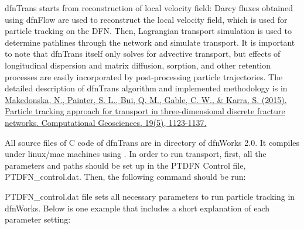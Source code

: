 \documentclass[letterpaper,10pt,english]{sphinxmanual}
\begin{document}
dfnTrans starts from  reconstruction of local velocity field: Darcy fluxes
obtained using dfnFlow are used to reconstruct the local velocity field, which
is used for particle tracking on the DFN. Then, Lagrangian transport simulation
is used to determine pathlines through the network and simulate transport. It is
important to note that dfnTrans itself only solves for advective transport, but
effects of longitudinal dispersion and matrix diffusion, sorption, and other
retention processes are easily incorporated by post-processing particle
trajectories. The detailed description of dfnTrans algorithm and implemented
methodology is in \href{http://link.springer.com/article/10.1007/s10596-015-9525-4}{Makedonska, N., Painter, S. L., Bui, Q. M., Gable, C. W., \&
Karra, S. (2015). Particle tracking approach for transport in three-dimensional
discrete fracture networks. Computational Geosciences, 19(5), 1123-1137.}

All source files of C code of dfnTrans are in  directory of
dfnWorks 2.0. It compiles under linux/mac machines using .  In order
to run transport, first, all the parameters and paths should be set up in the
PTDFN Control file, PTDFN\_control.dat. Then, the following command should be
run:


PTDFN\_control.dat file sets all necessary parameters to run particle tracking in
dfnWorks.  Below is one  example that includes a short
explanation of each parameter setting:
\end{document}
